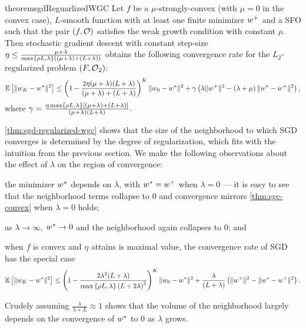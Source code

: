 \begin{restatable}{theorem}{sgdReguarlizedWGC}\label{thm:sgd-regularized-wgc}
    Let \( f \) be a \( \mu \)-strongly-convex (with \( \mu = 0 \) in the convex case), \( L \)-smooth function with at least one finite minimizer \( \wbar \) and \oracle{} a \ac{SFO} such that the pair \( \rbr{f, \oracle{}} \) satisfies the weak growth condition with constant \( \rho \).
    Then stochastic gradient descent with constant step-size \( \eta \leq \frac{\mu + \lambda}{\max\cbr{\rho L, \lambda}\rbr{(\mu + \lambda) + (L + \lambda)}} \) obtains the following convergence rate for the \( L_2 \)-regularized problem \( \rbr{F, \oracle{}_2} \):
    \[  \E\sbr{\norm{\w_K - \wopt}^2} \leq \rbr{1 - \frac{2 \eta (\mu + \lambda)(L + \lambda)}{(\mu + \lambda) + (L + \lambda)}}^K \norm{\w_0 - \wopt}^2 + \gamma\rbr{\lambda \norm{\wbar}^2 - \rbr{\lambda + \mu}\norm{\wopt - \wbar}^2}, \]
    where \( \gamma = \frac{\eta \max\cbr{\rho L, \lambda} \sbr{(\mu + \lambda) + (L + \lambda)}}{(\mu + \lambda)(L + \lambda)}. \)  
\end{restatable}

\autoref{thm:sgd-regularized-wgc} shows that the size of the neighborhood to which \ac{SGD} converges is determined by the degree of regularization, which fits with the intuition from the previous section.
We make the following observations about the effect of \( \lambda \) on the region of convergence:
\begin{inparaenum}[(i)]
\item the minimizer \( \wopt \) depends on \( \lambda \), with \( \wopt = \wbar \) when \( \lambda = 0 \) --- it is easy to see that the neighborhood terms collapse to \( 0 \) and convergence mirrors \autoref{thm:sgc-convex} when \( \lambda = 0 \) holds;
\item as \( \lambda \rightarrow \infty \), \( \wopt \rightarrow 0 \) and the neighborhood again collapses to \( 0 \); and 
\item when \( f \) is convex and \( \eta \) attains is maximal value, the convergence rate of \ac{SGD} has the special case 
\[  \E\sbr{\norm{\w_K - \wopt}^2} \leq \rbr{1 - \frac{2 \lambda^2(L + \lambda)}{\max\cbr{\rho L, \lambda} \rbr{L + 2\lambda}^2}}^K \norm{\w_0 - \wopt}^2 + \frac{\lambda}{\rbr{L + \lambda}}\rbr{\norm{\wbar}^2 - \norm{\wopt - \wbar}^2}. \]
\end{inparaenum}
Crudely assuming \( \frac{\lambda}{\lambda + L} \approx 1 \) shows that the volume of the neighborhood largely depends on the convergence of \( \wopt \) to \( 0 \) as \( \lambda \) grows.

